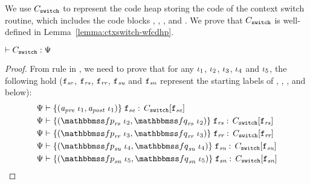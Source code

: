 We use $C_{\texttt{switch}}$ to represent the
code heap storing the code of the context switch routine,
which includes the code blocks \SwitchEntry{},
\regsave{}, \regrestore{},
\SaveUsedWin{} and \SwitchNewTask{}. We prove that
$C_{\texttt{switch}}$ is well-defined in
Lemma~\ref{lemma:ctxswitch-wfcdhp}.

\begin{lemma}
    \em
    \label{lemma:ctxswitch-wfcdhp}
    $\vdash {C_{\texttt{switch}}} : {\Psi{}}$
\end{lemma}
\begin{proof}
    From  rule in 
    \Fig{\ref{fig:Selected Inference Rules for Refinement Verification}}, 
    we need to prove that for any $\iota_1$,
    $\iota_2$, $\iota_3$,
    $\iota_4$ and $\iota_5$, the following hold
    ($\texttt{f}_{\textit{se}}$, $\texttt{f}_{\textit{rs}}$,
    $\texttt{f}_{\textit{rr}}$, $\texttt{f}_{\textit{su}}$ and
    $\texttt{f}_{\textit{sn}}$ represent the starting labels of
    \SwitchEntry{}, \regsave{}, \regrestore{},
    \SaveUsedWin{} and \SwitchNewTask{} below):
    \begin{align}
        & \wfcblk{\Apre \ \lgvl_1}{\Apost \ \lgvl_1}
            {\lab{\textit{se}}}
            {\code_{\texttt{switch}}
            [\lab{\textit{se}}]}
            \label{ctxswitch-wfse} \\
        & \wfcblk{\relspecpre_{\textit{rs}} \ \lgvl_2}
            {\relspecpost_{\textit{rs}} \ \lgvl_2}
            {\lab{\textit{rs}}}
            {\code_{\texttt{switch}}
            [\lab{\textit{rs}}]}
            \label{ctxswitch-wfrs} \\
        & \wfcblk{\relspecpre_{\textit{rr}} \ \lgvl_3}
            {\relspecpost_{\textit{rr}}\ \lgvl_3}
            {\lab{\textit{rr}}}
            {\code_{\texttt{switch}}
            [\lab{\textit{rr}}]}
            \label{ctxswitch-wfrr} \\
        & \wfcblk{\relspecpre_{\textit{su}} \ \lgvl_4}
            {\relspecpost_{\textit{su}} \ \lgvl_4}
            {\lab{\textit{su}}}
            {\code_{\texttt{switch}}[\lab{\textit{su}}]}
            \label{ctxswitch-wfsu} \\
        & \wfcblk{\relspecpre_{\textit{sn}} \ \lgvl_5}
            {\relspecpost_{\textit{sn}} \ \lgvl_5}
            {\lab{\textit{sn}}}
            {\code_{\texttt{switch}}[\lab{\textit{sn}}]}
            \label{ctxswitch-wfsn}
    \end{align}


\end{proof}
